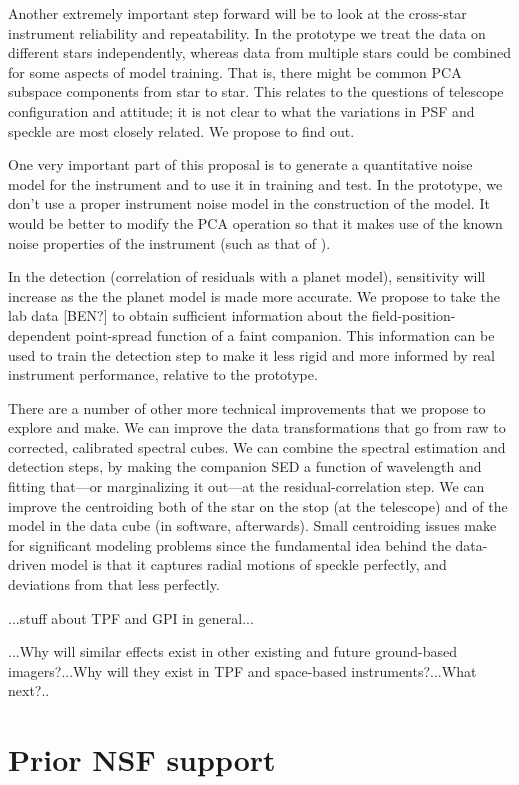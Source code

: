 \documentclass[12pt,pdftex,preprint]{aastex}
\begin{document}
Another extremely important step forward will be to look at the
cross-star instrument reliability and repeatability.  In the prototype
we treat the data on different stars independently, whereas data from
multiple stars could be combined for some aspects of model training.
That is, there might be common PCA subspace components from star to
star.  This relates to the questions of telescope configuration and
attitude; it is not clear to what the variations in PSF and speckle
are most closely related.  We propose to find out.

One very important part of this proposal is to generate a quantitative
noise model for the instrument and to use it in training and test.  In
the prototype, we don't use a proper instrument noise model in the
construction of the model.  It would be better to modify the PCA
operation so that it makes use of the known noise properties of the
instrument (such as that of \citealt{hmf}).

In the detection (correlation of residuals with a planet model),
sensitivity will increase as the the planet model is made more
accurate.  We propose to take the lab data [BEN?] to obtain sufficient
information about the field-position-dependent point-spread function
of a faint companion.  This information can be used to train the
detection step to make it less rigid and more informed by real
instrument performance, relative to the prototype.

There are a number of other more technical improvements that we
propose to explore and make.  We can improve the data transformations
that go from raw to corrected, calibrated spectral cubes.  We can
combine the spectral estimation and detection steps, by making the
companion SED a function of wavelength and fitting that---or
marginalizing it out---at the residual-correlation step.  We can
improve the centroiding both of the star on the stop (at the
telescope) and of the model in the data cube (in software,
afterwards).  Small centroiding issues make for significant modeling
problems since the fundamental idea behind the data-driven model is
that it captures radial motions of speckle perfectly, and deviations
from that less perfectly.

...stuff about TPF and GPI in general...

...Why will similar effects exist in other existing and future
ground-based imagers?...Why will they exist in TPF and space-based
instruments?...What next?..

\section{Prior NSF support}
\end{document}
